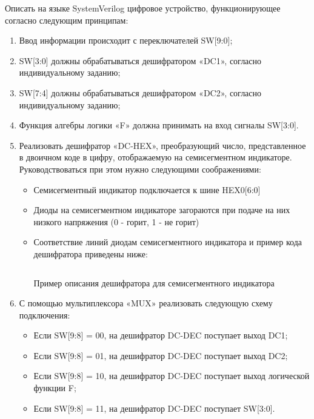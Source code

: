 \par{Описать на языке SystemVerilog цифровое устройство, функционирующее согласно следующим принципам:}
\begin{enumerate}
  \item Ввод информации происходит с переключателей SW[9:0];
  \item SW[3:0] должны обрабатываться дешифратором «DC1», согласно индивидуальному заданию;
  \item SW[7:4] должны обрабатываться дешифратором «DC2», согласно индивидуальному заданию;
  \item Функция алгебры логики «F» должна принимать на вход сигналы SW[3:0].

  \item Реализовать дешифратор «DC-HEX», преобразующий число, представленное в двоичном коде в цифру, отображаемую на семисегментном индикаторе. Руководствоваться при этом нужно следующими соображениями:
    \begin{itemize}
      \item Семисегментный индикатор подключается к шине HEX0[6:0]
      \item Диоды на семисегментном индикаторе загораются при подаче на них низкого напряжения (0 - горит, 1 - не горит)
      \item Соответствие линий диодам семисегментного индикатора и пример кода дешифратора приведены ниже:
        \begin{figure}[H]
          \centering
          \def\svgwidth{3cm}
          
          \label{fig:decoder}
        \end{figure}

        \begin{listing}[H]
          \inputminted{SystemVerilog}{code_examples/lab_1/dc_hex.sv}
          \caption{Пример описания дешифратора для семисегментного индикатора}
        \end{listing}


    \end{itemize}
    \item С помощью мультиплексора «MUX» реализовать следующую схему подключения:
      \begin{itemize}
        \item Если SW[9:8] = 00, на дешифратор DC-DEC поступает выход DC1;
        \item Если SW[9:8] = 01, на дешифратор DC-DEC поступает выход DC2;
        \item Если SW[9:8] = 10, на дешифратор DC-DEC поступает выход логической функции F;
        \item Если SW[9:8] = 11, на дешифратор DC-DEC поступает SW[3:0].
      \end{itemize}
\end{enumerate}



